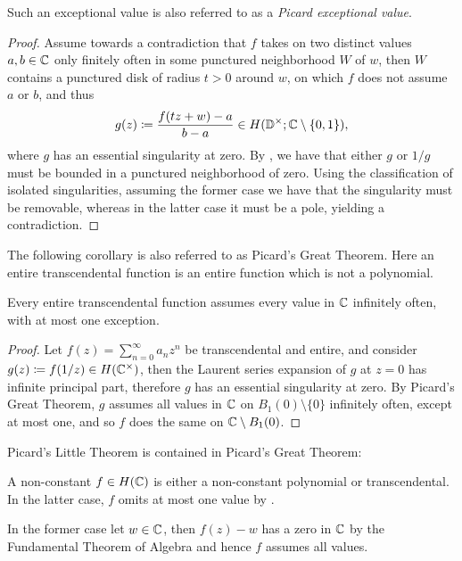 Such an exceptional value is also referred to as a \emph{Picard exceptional value}.

\begin{proof}
    Assume towards a contradiction that $f$ takes on two distinct values $a, b \in \mathbb{C}$ only finitely often in some punctured neighborhood $W$ of $w$, then $W$ contains a punctured disk of radius $t > 0$ around $w$, on which $f$ does not assume $a$ or $b$, and thus
    $$ g(z) \coloneqq \frac{f(t z + w) - a}{b - a} \in H(\mathbb{D}^\times; \mathbb{C} \setminus \{ 0, 1 \}), $$
    where $g$ has an essential singularity at zero. By , we have that either $g$ or $1/g$ must be bounded in a punctured neighborhood of zero. Using the classification of isolated singularities, assuming the former case we have that the singularity must be removable, whereas in the latter case it must be a pole, yielding a contradiction.
\end{proof}

The following corollary is also referred to as Picard's Great Theorem. Here an entire transcendental function is an entire function which is not a polynomial.

\begin{corollary} \label{cor:transcendental-every-value-inf}
    Every entire transcendental function assumes every value in $\mathbb{C}$ infinitely often, with at most one exception.
\end{corollary}

\begin{proof}
    Let $f(z) = \sum_{n=0}^\infty a_n z^n$ be transcendental and entire, and consider $g(z) \coloneqq f(1 / z) \in H(\mathbb{C}^\times)$, then the Laurent series expansion of $g$ at $z = 0$ has infinite principal part, therefore $g$ has an essential singularity at zero. By Picard's Great Theorem, $g$ assumes all values in $\mathbb{C}$ on $B_1(0) \setminus \{ 0 \}$ infinitely often, except at most one, and so $f$ does the same on $\mathbb{C} \setminus B_1(0)$.
\end{proof}

\begin{remark}
    Picard's Little Theorem is contained in Picard's Great Theorem:
    
    A non-constant $f \in H(\mathbb{C})$ is either a non-constant polynomial or transcendental. In the latter case, $f$ omits at most one value by .
    
    In the former case let $w \in \mathbb{C}$, then $f(z) - w$ has a zero in $\mathbb{C}$ by the Fundamental Theorem of Algebra and hence $f$ assumes all values.
\end{remark}